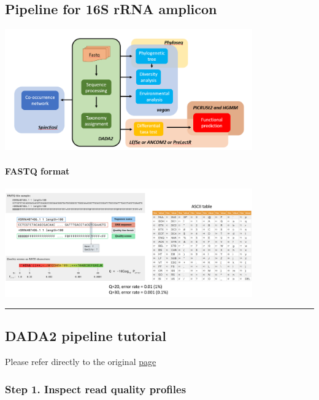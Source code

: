 \documentclass[
]{article}
\begin{document}
\hypertarget{pipeline-for-16s-rrna-amplicon}{%
\subsection{Pipeline for 16S rRNA
amplicon}\label{pipeline-for-16s-rrna-amplicon}}

\includegraphics[width=0.8\textwidth,height=\textheight]{images/Fig5.png}

\hypertarget{fastq-format}{%
\paragraph{FASTQ format}\label{fastq-format}}

\includegraphics[width=0.8\textwidth,height=\textheight]{images/Fig6.png}

\begin{center}\rule{0.5\linewidth}{0.5pt}\end{center}

\hypertarget{dada2-pipeline-tutorial}{%
\subsection{DADA2 pipeline tutorial}\label{dada2-pipeline-tutorial}}

Please refer directly to the original
\href{https://benjjneb.github.io/dada2/tutorial.html}{page}

\hypertarget{step-1.-inspect-read-quality-profiles}{%
\subsubsection{Step 1. Inspect read quality
profiles}\label{step-1.-inspect-read-quality-profiles}}
\end{document}
